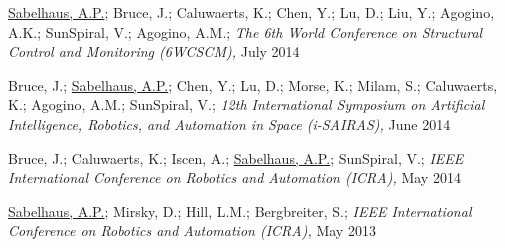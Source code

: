 \documentclass[letterpaper]{deedy-resume} %
\begin{document}
{\begin{etaremune}
\item {} \underline{Sabelhaus, A.P.}; Bruce, J.; Caluwaerts, K.; Chen, Y.; Lu, D.; Liu, Y.; Agogino, A.K.; SunSpiral, V.; Agogino, A.M.; {\it The 6th World Conference on Structural Control and Monitoring (6WCSCM),} July 2014

\item {} Bruce, J.; \underline{Sabelhaus, A.P.}; Chen, Y.; Lu, D.; Morse, K.; Milam, S.; Caluwaerts, K.; Agogino, A.M.; SunSpiral, V.; {\it 12th International Symposium on Artificial Intelligence, Robotics, and Automation in Space (i-SAIRAS),} June 2014

\item {} Bruce, J.; Caluwaerts, K.; Iscen, A.; \underline{Sabelhaus, A.P.}; SunSpiral, V.; {\it IEEE International Conference on Robotics and Automation (ICRA),} May 2014

\item {} \underline{Sabelhaus, A.P.}; Mirsky, D.; Hill, L.M.; Bergbreiter, S.; {\it IEEE International Conference on Robotics and Automation (ICRA),} May 2013


\end{etaremune}










}
\end{document}
